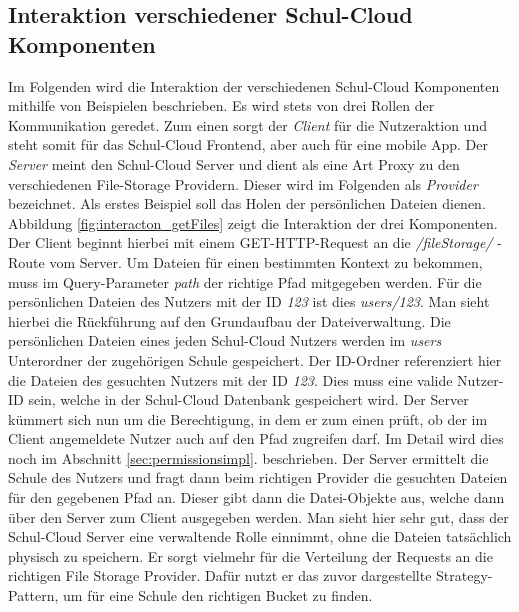 \subsection{Interaktion verschiedener Schul-Cloud Komponenten}
\label{sec:interactionconcept}

Im Folgenden wird die Interaktion der verschiedenen Schul-Cloud Komponenten mithilfe von Beispielen beschrieben. Es wird stets von drei Rollen der Kommunikation geredet. Zum einen sorgt der \textit{Client} für die Nutzeraktion und steht somit für das Schul-Cloud Frontend, aber auch für eine mobile App. Der \textit{Server} meint den Schul-Cloud Server und dient als eine Art Proxy zu den verschiedenen File-Storage Providern. Dieser wird im Folgenden als \textit{Provider} bezeichnet. Als erstes Beispiel soll das Holen der persönlichen Dateien dienen. Abbildung \ref{fig:interacton_getFiles} zeigt die Interaktion der drei Komponenten. Der Client beginnt hierbei mit einem GET-HTTP-Request an die \textit{/fileStorage/} - Route vom Server. Um Dateien für einen bestimmten Kontext zu bekommen, muss im Query-Parameter \textit{path} der richtige Pfad mitgegeben werden. Für die persönlichen Dateien des Nutzers mit der ID \textit{123} ist dies \textit{users/123}. Man sieht hierbei die Rückführung auf den Grundaufbau der Dateiverwaltung. Die persönlichen Dateien eines jeden Schul-Cloud Nutzers werden im \textit{users} Unterordner der zugehörigen Schule gespeichert. Der ID-Ordner referenziert hier die Dateien des gesuchten Nutzers mit der ID \textit{123}. Dies muss eine valide Nutzer-ID sein, welche in der Schul-Cloud Datenbank gespeichert wird. Der Server kümmert sich nun um die Berechtigung, in dem er zum einen prüft, ob der im Client angemeldete Nutzer auch auf den Pfad zugreifen darf. Im Detail wird dies noch im Abschnitt \ref{sec:permissionsimpl}. beschrieben. Der Server ermittelt die Schule des Nutzers und fragt dann beim richtigen Provider die gesuchten Dateien für den gegebenen Pfad an. Dieser gibt dann die Datei-Objekte aus, welche dann über den Server zum Client ausgegeben werden. Man sieht hier sehr gut, dass der Schul-Cloud Server eine verwaltende Rolle einnimmt, ohne die Dateien tatsächlich physisch zu speichern. Er sorgt vielmehr für die Verteilung der Requests an die richtigen File Storage Provider. Dafür nutzt er das zuvor dargestellte Strategy-Pattern, um für eine Schule den richtigen Bucket zu finden.

